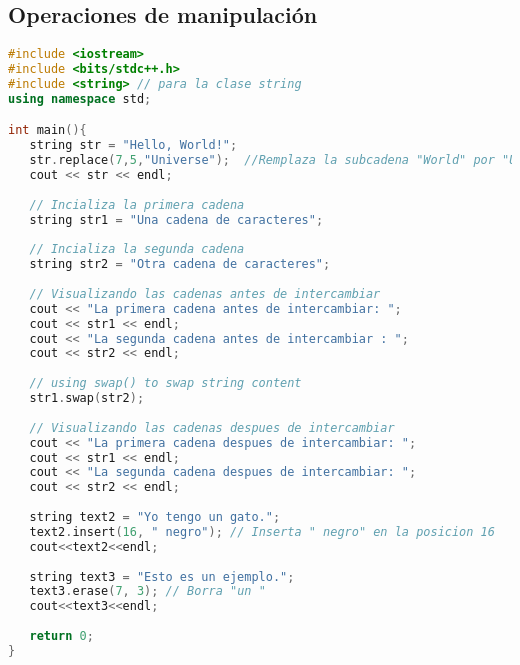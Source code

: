 \subsection{Operaciones de manipulación}
\begin{lstlisting}[language=C++]
#include <iostream>
#include <bits/stdc++.h>
#include <string> // para la clase string
using namespace std;

int main(){
   string str = "Hello, World!";
   str.replace(7,5,"Universe");  //Remplaza la subcadena "World" por "Universe"
   cout << str << endl;
	
   // Incializa la primera cadena
   string str1 = "Una cadena de caracteres";
	
   // Incializa la segunda cadena
   string str2 = "Otra cadena de caracteres";
	
   // Visualizando las cadenas antes de intercambiar
   cout << "La primera cadena antes de intercambiar: ";
   cout << str1 << endl;
   cout << "La segunda cadena antes de intercambiar : ";
   cout << str2 << endl;
	
   // using swap() to swap string content
   str1.swap(str2);
	
   // Visualizando las cadenas despues de intercambiar
   cout << "La primera cadena despues de intercambiar: ";
   cout << str1 << endl;
   cout << "La segunda cadena despues de intercambiar: ";
   cout << str2 << endl;
	
   string text2 = "Yo tengo un gato.";
   text2.insert(16, " negro"); // Inserta " negro" en la posicion 16
   cout<<text2<<endl;
	
   string text3 = "Esto es un ejemplo.";
   text3.erase(7, 3); // Borra "un "
   cout<<text3<<endl;
	
   return 0;
}	
\end{lstlisting}
